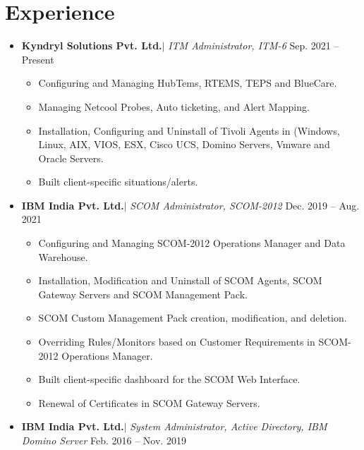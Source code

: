 \documentclass[letterpaper, 12 pt]{article}
\begin{document}
		\section*{Experience}
		\begin{itemize}[noitemsep]
			\item {\textbf{Kyndryl Solutions Pvt. Ltd.}$|$ \textit{ITM Administrator, ITM-6} \hfill {Sep. 2021 -- Present}}\\
			\vspace*{-0.6cm}
			\begin{itemize}[noitemsep]
				\item {Configuring and Managing HubTems, RTEMS, TEPS and BlueCare.}
				\item {Managing Netcool Probes, Auto ticketing, and Alert Mapping.}
				\item {Installation, Configuring and Uninstall of Tivoli Agents in (Windows, Linux, AIX, VIOS, ESX, Cisco UCS, Domino Servers, Vmware and Oracle Servers.}
				\item {Built client-specific situations/alerts.}
			\end{itemize}
			\vspace*{-0.1cm}
			\item {\textbf{IBM India Pvt. Ltd.}$|$ \textit{SCOM Administrator, SCOM-2012} \hfill {Dec. 2019 -- Aug. 2021}}\\
			\vspace*{-0.6cm}
			\begin{itemize}[noitemsep]
				\item {Configuring and Managing SCOM-2012 Operations Manager and Data Warehouse.}
				\item {Installation, Modification and Uninstall of SCOM Agents, SCOM Gateway Servers and  SCOM Management Pack.}
				\item {SCOM Custom Management Pack creation, modification, and deletion.}
				\item {Overriding Rules/Monitors based on Customer Requirements in SCOM-2012 Operations Manager.}
				\item {Built client-specific dashboard for the SCOM Web Interface.}
				\item {Renewal of Certificates in SCOM Gateway Servers.}	
			\end{itemize}
			\vspace*{-0.1cm}
			\item {\textbf{IBM India Pvt. Ltd.}$|$ \textit{System Administrator, Active Directory, IBM Domino Server}	\hfill{Feb. 2016 -- Nov. 2019}}\\

\end{itemize}
\end{document}
